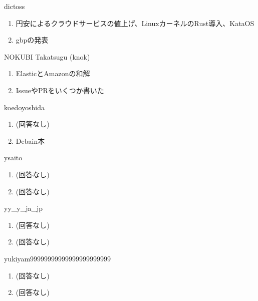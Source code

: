 \begin{prework}{ dictoss }
  \begin{enumerate}
  \item 円安によるクラウドサービスの値上げ、LinuxカーネルのRust導入、KataOS
  \item gbpの発表
  \end{enumerate}
\end{prework}

\begin{prework}{ NOKUBI Takatsugu (knok) }
  \begin{enumerate}
  \item ElasticとAmazonの和解
  \item IssueやPRをいくつか書いた
  \end{enumerate}
\end{prework}

\begin{prework}{ koedoyoshida }
  \begin{enumerate}
  \item (回答なし)
  \item Debain本
  \end{enumerate}
\end{prework}

\begin{prework}{ ysaito }
  \begin{enumerate}
  \item (回答なし)
  \item (回答なし)
  \end{enumerate}
\end{prework}

\begin{prework}{ yy\_y\_ja\_jp }
  \begin{enumerate}
  \item (回答なし)
  \item (回答なし)
  \end{enumerate}
\end{prework}

\begin{prework}{ yukiyam99999999999999999999999 }
  \begin{enumerate}
  \item (回答なし)
  \item (回答なし)
  \end{enumerate}
\end{prework}
